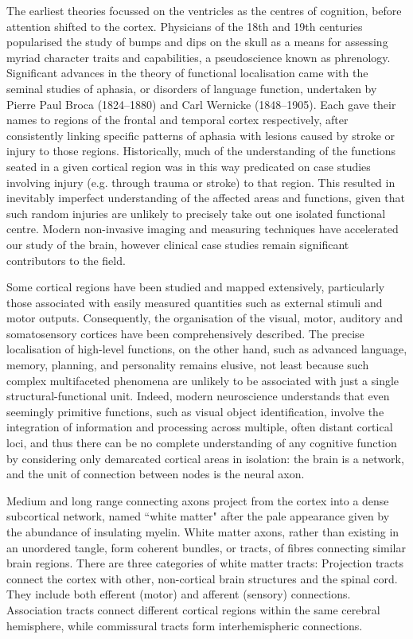 The earliest theories focussed on the ventricles as the centres of cognition, before attention shifted to the cortex.\autocite{Folzenlogen2019}
Physicians of the 18th and 19th centuries popularised the study of bumps and dips on the skull as a means for assessing myriad character traits and capabilities, a pseudoscience known as phrenology.
Significant advances in the theory of functional localisation came with the seminal studies of aphasia, or disorders of language function, undertaken by Pierre Paul Broca (1824--1880) and Carl Wernicke (1848--1905).
Each gave their names to regions of the frontal and temporal cortex respectively, after consistently linking specific patterns of aphasia with lesions caused by stroke or injury to those regions.
Historically, much of the understanding of the functions seated in a given cortical region was in this way predicated on case studies involving injury (e.g. through trauma or stroke) to that region.
This resulted in inevitably imperfect understanding of the affected areas and functions, given that such random injuries are unlikely to precisely take out one isolated functional centre.
Modern non-invasive imaging and measuring techniques have accelerated our study of the brain, however clinical case studies remain significant contributors to the field.

Some cortical regions have been studied and mapped extensively, particularly those associated with easily measured quantities such as external stimuli and motor outputs.
Consequently, the organisation of the visual, motor, auditory and somatosensory cortices have been comprehensively described.
The precise localisation of high-level functions, on the other hand, such as advanced language, memory, planning, and personality remains elusive, not least because such complex multifaceted phenomena are unlikely to be associated with just a single structural-functional unit.\autocite{Catani2007}
Indeed, modern neuroscience understands that even seemingly primitive functions, such as visual object identification, involve the integration of information and processing across multiple, often distant cortical loci,\autocite{ffytche2005} and thus there can be no complete understanding of any cognitive function by considering only demarcated cortical areas in isolation: the brain is a network, and the unit of connection between nodes is the neural axon.

Medium and long range connecting axons project from the cortex into a dense subcortical network, named ``white matter" after the pale appearance given by the abundance of insulating myelin.
White matter axons, rather than existing in an unordered tangle, form coherent bundles, or tracts, of fibres connecting similar brain regions.
There are three categories of white matter tracts:
Projection tracts connect the cortex with other, non-cortical brain structures and the spinal cord.
They include both efferent (motor) and afferent (sensory) connections.
Association tracts connect different cortical regions within the same cerebral hemisphere, while commissural tracts form interhemispheric connections.

